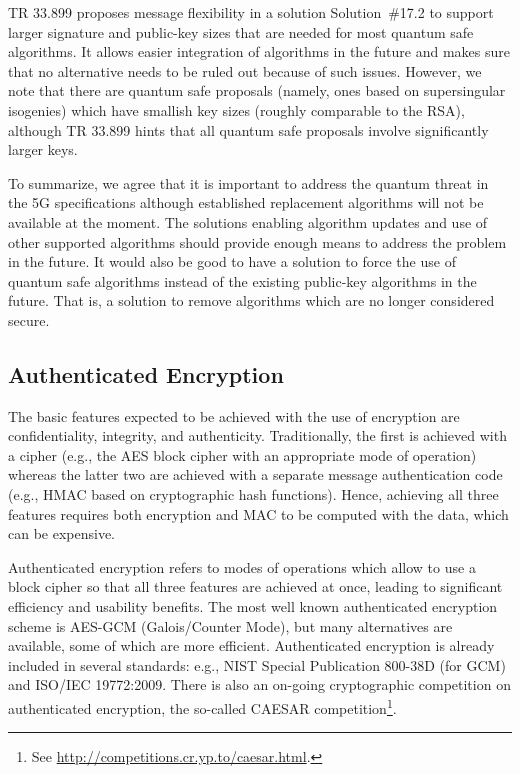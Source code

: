 \documentclass[lnicst,sechang,a4paper]{svmultln}
\begin{document}
TR 33.899 proposes message flexibility in a solution Solution~\#17.2 to support larger signature and public-key sizes that are needed for most quantum safe algorithms. It allows easier integration of algorithms in the future and makes sure that no alternative needs to be ruled out because of such issues. However, we note that there are quantum safe proposals (namely, ones based on supersingular isogenies) which have smallish key sizes (roughly comparable to the RSA), although TR 33.899 hints that all quantum safe proposals involve significantly larger keys.

To summarize, we agree that it is important to address the quantum threat in the 5G specifications although established replacement algorithms will not be available at the moment. The solutions enabling algorithm updates and use of other supported algorithms should provide enough means to address the problem in the future. It would also be good to have a solution to force the use of quantum safe algorithms instead of the existing public-key algorithms in the future. That is, a solution to remove algorithms which are no longer considered secure.


\subsection{Authenticated Encryption}
\label{sec:ae}

The basic features expected to be achieved with the use of encryption are confidentiality, integrity, and authenticity. Traditionally, the first is achieved with a cipher (e.g., the AES block cipher with an appropriate mode of operation) whereas the latter two are achieved with a separate message authentication code (e.g., HMAC based on cryptographic hash functions). Hence, achieving all three features requires both encryption and MAC to be computed with the data, which can be expensive. 

Authenticated encryption refers to modes of operations which allow to use a block cipher so that all three features are achieved at once, leading to significant efficiency and usability benefits. The most well known authenticated encryption scheme is AES-GCM (Galois/Counter Mode), but many alternatives are available, some of which are more efficient. Authenticated encryption is already included in several standards: e.g., NIST Special Publication 800-38D (for GCM) and ISO/IEC 19772:2009. There is also an on-going cryptographic competition on authenticated encryption, the so-called CAESAR competition\footnote{See \url{http://competitions.cr.yp.to/caesar.html}.}. 
\end{document}

